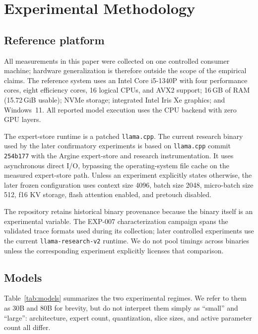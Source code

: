 \section{Experimental Methodology}
\label{sec:methodology}

\subsection{Reference platform}

All measurements in this paper were collected on one controlled consumer machine; hardware generalization is therefore outside the scope of the empirical claims. The reference system uses an Intel Core i5-1340P with four performance cores, eight efficiency cores, 16 logical CPUs, and AVX2 support; 16\,GB of RAM (15.72\,GiB usable); NVMe storage; integrated Intel Iris Xe graphics; and Windows~11. All reported model execution uses the CPU backend with zero GPU layers.

The expert-store runtime is a patched \texttt{llama.cpp}. The current research binary used by the later confirmatory experiments is based on \texttt{llama.cpp} commit \texttt{254b177} with the Argine expert-store and research instrumentation. It uses asynchronous direct I/O, bypassing the operating-system file cache on the measured expert-store path. Unless an experiment explicitly states otherwise, the later frozen configuration uses context size 4096, batch size 2048, micro-batch size 512, f16 KV storage, flash attention enabled, and pretouch disabled.

The repository retains historical binary provenance because the binary itself is an experimental variable. The EXP-007 characterization campaign spans the validated trace formats used during its collection; later controlled experiments use the current \texttt{llama-research-v2} runtime. We do not pool timings across binaries unless the corresponding experiment explicitly licenses that comparison.

\subsection{Models}

Table~\ref{tab:models} summarizes the two experimental regimes. We refer to them as 30B and 80B for brevity, but do not interpret them simply as ``small'' and ``large'': architecture, expert count, quantization, slice sizes, and active parameter count all differ.

